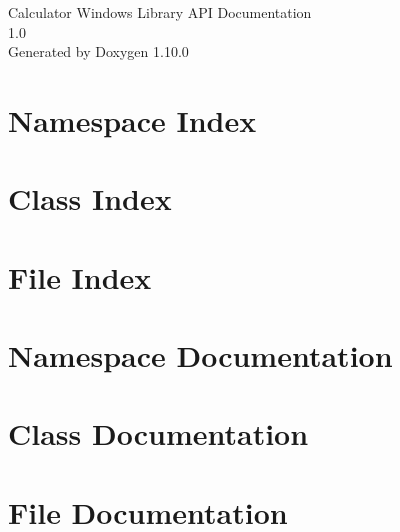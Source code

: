 \documentclass[twoside]{book}
\newcommand{\+}{\discretionary{\mbox{\scriptsize$\hookleftarrow$}}{}{}}
\newcommand{\clearemptydoublepage}{%
    \newpage{\pagestyle{empty}\cleardoublepage}%
  }
\begin{document}
  \raggedbottom
    \hypersetup{pageanchor=false,
                bookmarksnumbered=true,
                pdfencoding=unicode
               }
  \begin{titlepage}
  \vspace*{7cm}
  \begin{center}%
  {\Large Calculator Windows Library API Documentation}\\
  [1ex]\large 1.\+0 \\
  \vspace*{1cm}
  {\large Generated by Doxygen 1.10.0}\\
  \end{center}
  \end{titlepage}
  \clearemptydoublepage
  \tableofcontents
  \clearemptydoublepage
  \hypersetup{pageanchor=true}

\chapter{Namespace Index}

\chapter{Class Index}

\chapter{File Index}

\chapter{Namespace Documentation}



\chapter{Class Documentation}



\chapter{File Documentation}















  \backmatter
  \newpage
  \clearemptydoublepage
  \printindex
\end{document}
